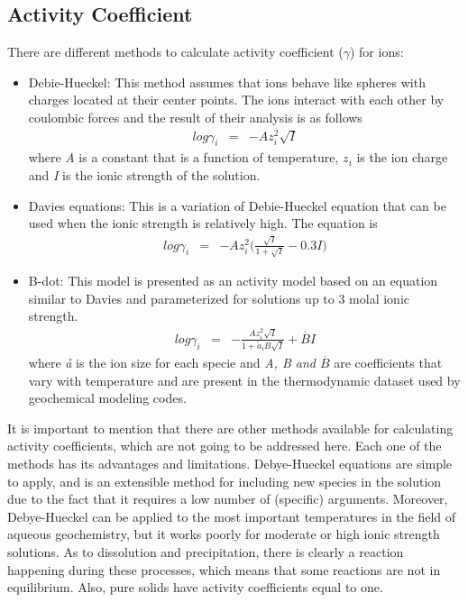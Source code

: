 \subsection{Activity Coefficient} \label{actCoeff}
There are different methods to calculate activity coefficient ($\gamma$) for ions:
\begin{itemize}
\item Debie-Hueckel: This method assumes that ions behave like spheres with charges located at their center points. The ions interact with each other by coulombic forces and the result of their analysis is as follows
\begin{eqnarray} \label{eq:debyeEq}
log \gamma_i &=& - Az_i^2\sqrt{I}
\end{eqnarray} 
where \emph{A} is a constant that is a function of temperature, \emph{$z_i$} is the ion charge and \emph{I} is the ionic strength of the solution.
\item Davies equations: This is a variation of Debie-Hueckel equation that can be used when the ionic strength is relatively high. The equation is
\begin{eqnarray} \label{eq:daviesEq}
log \gamma_i &=& - Az_i^2 \bigg(\frac{\sqrt{I}}{1+\sqrt{I}} - 0.3 I)
\end{eqnarray}
\item B-dot: This model is presented as an activity model based on an equation similar to Davies and parameterized for solutions up to 3 molal ionic strength.
\begin{eqnarray} \label{eq:bdotEq}
log \gamma_i &=& - \frac{Az_i^2 \sqrt{I}}{1+ \mathring{a}_i B \sqrt{I}} + \overset{.}{B} I 
\end{eqnarray}
where \emph{\aa}  is the ion size for each specie and \emph{A, B and $\overset{.}{B}$} are coefficients that vary with temperature and are present in the thermodynamic dataset used by geochemical modeling codes.
\end{itemize}
It is important to mention that there are other methods available for calculating activity coefficients, which are not going to be addressed here. Each one of the methods has its advantages and limitations. Debye-Hueckel equations are simple to apply, and is an extensible method for including new species in the solution due to the fact that it requires a low number of (specific) arguments. Moreover, Debye-Hueckel can be applied to the most important temperatures in the field of aqueous geochemistry, but it works poorly for moderate or high ionic strength solutions.
As to dissolution and precipitation, there is clearly a reaction happening during these processes, which means that some reactions are not in equilibrium. Also, pure solids have activity coefficients equal to one.

